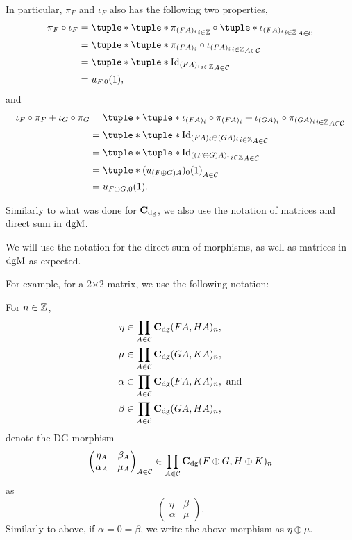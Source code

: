 \begin{remark}
    In particular, \( \pi_F \) and \( \iota_F \) also has the following two properties,
    \begin{align*}
        \pi_F \circ \iota_F &= \tuple*{ \tuple*{ \pi_{(F A)_i} }_{i \in \Zb} \circ \tuple*{ \iota_{(F A)_i} }_{i \in \Zb} }_{A \in \Cc} \\
        &= \tuple*{ \tuple*{ \pi_{(F A)_i} \circ \iota_{(F A)_i} }_{i \in \Zb} }_{A \in \Cc} \\
        &= \tuple*{ \tuple*{ \Id_{(F A)_i} }_{i \in \Zb} }_{A \in \Cc} \\
        &= u_{F, 0}(1),
    \end{align*}
    and
    \begin{align*}
        \iota_F \circ \pi_F + \iota_G \circ \pi_G &= \tuple*{ \tuple*{\iota_{(F A)_i} \circ \pi_{(F A)_i} + \iota_{(G A)_i} \circ \pi_{(G A)_i} }_{i \in \Zb} }_{A \in \Cc} \\
        &= \tuple*{ \tuple*{ \Id_{(F A)_i \oplus (G A)_i} }_{i \in \Zb} }_{A \in \Cc} \\
        &= \tuple*{ \tuple*{ \Id_{((F \oplus G) A)_i} }_{i \in \Zb} }_{A \in \Cc} \\
        &= \tuple*{ (u_{(F \oplus G) A})_0 (1)}_{A \in \Cc} \\
        &= u_{F \oplus G, 0} (1).
    \end{align*}
\end{remark}

Similarly to what was done for \( \operatorname{\mathbf{C}}_{\operatorname{dg}} \), we also use the notation of matrices and direct sum in \( \operatorname{dgM} \).
\begin{notation}
    We will use the notation for the direct sum of morphisms, as well as matrices in \( \operatorname{dgM} \) as expected.

    For example, for a 2×2 matrix, we use the following notation:

    For \( n \in {\mathbb{Z}} \),
    \begin{align*}
        \eta &\in \prod_{A \in {\mathcal{C}}} \operatorname{\mathbf{C}}_{\operatorname{dg}}(F A, H A)_n, \\
        \mu &\in \prod_{A \in {\mathcal{C}}} \operatorname{\mathbf{C}}_{\operatorname{dg}}(G A, K A)_n, \\
        \alpha &\in \prod_{A \in {\mathcal{C}}} \operatorname{\mathbf{C}}_{\operatorname{dg}}(F A, K A)_n, \text{ and} \\
        \beta &\in \prod_{A \in {\mathcal{C}}} \operatorname{\mathbf{C}}_{\operatorname{dg}}(G A, H A)_n,
    \end{align*}
    denote the DG-morphism
    \[
        \begin{pmatrix}
            \eta_A & \beta_A \\
            \alpha_A & \mu_A
        \end{pmatrix}_{A \in {\mathcal{C}}}
        \in
        \prod_{A \in {\mathcal{C}}} \operatorname{\mathbf{C}}_{\operatorname{dg}}(F \oplus G, H \oplus K)_n
    \]
    as
    \[
        \begin{pmatrix}
            \eta & \beta \\
            \alpha & \mu
        \end{pmatrix}.
    \]
    Similarly to above, if \( \alpha = 0 = \beta \), we write the above morphism as \( \eta \oplus \mu \).
\end{notation}


